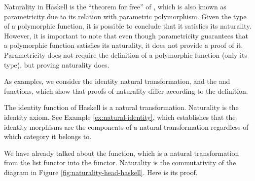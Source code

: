 Naturality in Haskell is the ``theorem for free'' of
\parencite{wadler-1989}, which is also known as parametricity due to
its relation with parametric polymorphism. Given the type of a
polymorphic function, it is possible to conclude that it satisfies its
naturality. However, it is important to note that even though
parametricity guarantees that a polymorphic function satisfies its
naturality, it does not provide a proof of it. Parametricity does not
require the definition of a polymorphic function (only its type), but
proving naturality does.

As examples, we consider the identity natural transformation, and the
 and  functions, which show that
proofs of naturality differ according to the definition.

\begin{example}
  \label{ex:natural-identity-haskell}

  The identity function of Haskell is a natural transformation.
  Naturality is the identity axiom. See Example
  \ref{ex:natural-identity}, which establishes that the identity
  morphisms are the components of a natural transformation regardless
  of which category it belongs to.

\end{example}

\begin{example}
  \label{ex:natural-head-haskell}

  We have already talked about the  function, which
  is a natural transformation from the list functor into the
   functor. Naturality is the commutativity of the
  diagram in Figure \ref{fig:naturality-head-haskell}. Here is its
  proof.

  \vspace{1em}
  \case{\texthaskell{[]}}
  \begin{steps}
  \end{steps}
  \begin{steps}
  \end{steps}

\end{example}

